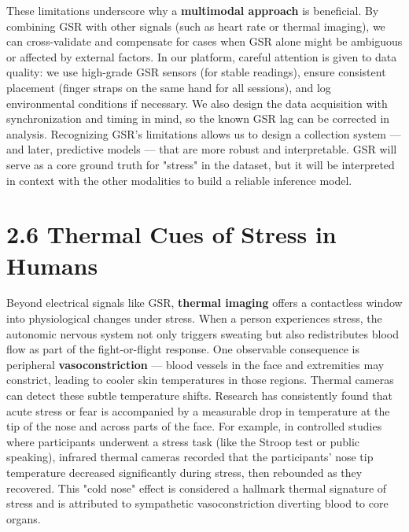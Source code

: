 \documentclass[11pt,a4paper]{report}
\begin{document}
These limitations underscore why a \textbf{multimodal approach} is
beneficial. By combining GSR with other signals (such as heart rate or
thermal imaging), we can cross-validate and compensate for cases when
GSR alone might be ambiguous or affected by external factors. In our
platform, careful attention is given to data quality: we use high-grade
GSR sensors (for stable readings), ensure consistent placement (finger
straps on the same hand for all sessions), and log environmental
conditions if necessary. We also design the data acquisition with
synchronization and timing in mind, so the known GSR lag can be
corrected in analysis. Recognizing GSR's limitations allows us to design
a collection system --- and later, predictive models --- that are more
robust and interpretable. GSR will serve as a core ground truth for
"stress" in the dataset, but it will be interpreted in context with the
other modalities to build a reliable inference model.

\section{2.6 Thermal Cues of Stress in Humans}

Beyond electrical signals like GSR, \textbf{thermal imaging} offers a
contactless window into physiological changes under stress. When a
person experiences stress, the autonomic nervous system not only
triggers sweating but also redistributes blood flow as part of the
fight-or-flight response. One observable consequence is peripheral
\textbf{vasoconstriction} --- blood vessels in the face and extremities may
constrict, leading to cooler skin temperatures in those regions. Thermal
cameras can detect these subtle temperature shifts. Research has
consistently found that acute stress or fear is accompanied by a
measurable drop in temperature at the tip of the nose and across parts
of the
face\cite{ContactlessStressThermal2022}.
For example, in controlled studies where participants underwent a stress
task (like the Stroop test or public speaking), infrared thermal cameras
recorded that the participants' nose tip temperature decreased
significantly during stress, then rebounded as they
recovered\cite{ContactlessStressThermal2022}\cite{ContactlessStressThermal2022}.
This "cold nose" effect is considered a hallmark thermal signature of
stress and is attributed to sympathetic vasoconstriction diverting blood
to core organs.
\end{document}

